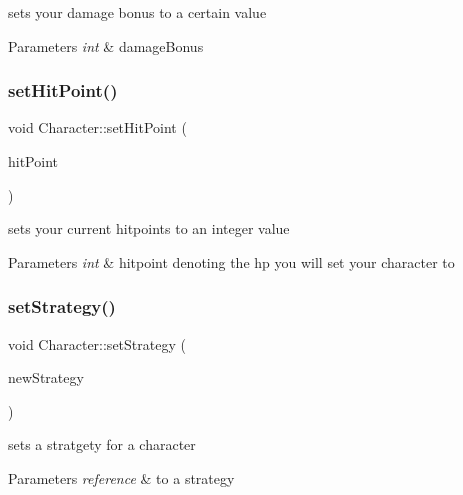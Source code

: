 sets your damage bonus to a certain value 
\begin{DoxyParams}{Parameters}
{\em int} & damage\+Bonus \\
\hline
\end{DoxyParams}
\hypertarget{class_character_ae4a09aee346b3e2cc86580e8b42a1a34}{}\label{class_character_ae4a09aee346b3e2cc86580e8b42a1a34} 
\subsubsection{\texorpdfstring{set\+Hit\+Point()}{setHitPoint()}}
{\footnotesize\ttfamily void Character\+::set\+Hit\+Point (\begin{DoxyParamCaption}\item[{int}]{hit\+Point }\end{DoxyParamCaption})}

sets your current hitpoints to an integer value 
\begin{DoxyParams}{Parameters}
{\em int} & hitpoint denoting the hp you will set your character to \\
\hline
\end{DoxyParams}
\hypertarget{class_character_a1035f8b0180e00a2d28ffc1caf26aad8}{}\label{class_character_a1035f8b0180e00a2d28ffc1caf26aad8} 
\subsubsection{\texorpdfstring{set\+Strategy()}{setStrategy()}}
{\footnotesize\ttfamily void Character\+::set\+Strategy (\begin{DoxyParamCaption}\item[{\hyperlink{class_character_strategy}{Character\+Strategy} $\ast$}]{new\+Strategy }\end{DoxyParamCaption})}

sets a stratgety for a character 
\begin{DoxyParams}{Parameters}
{\em reference} & to a strategy \\
\hline
\end{DoxyParams}
\hypertarget{class_character_af8b82c71db9032450b44133bc43c4668}{}\label{class_character_af8b82c71db9032450b44133bc43c4668} 
